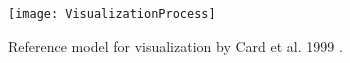 \begin{figure}[t]
  \texttt{[image: VisualizationProcess]}
  \caption[Reference model for visualization]{Reference model for visualization by Card et al. 1999 \cite{card_readings_1999}.}
  \label{fig:vizprocess}
  \centering
\end{figure}